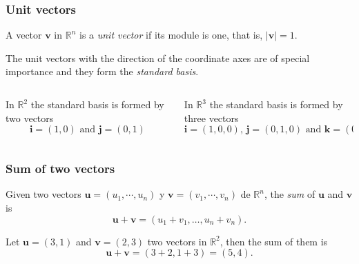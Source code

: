 \begin{frame}
\frametitle{Unit vectors}
\begin{definition}
A vector $\mathbf{v}$ in $\mathbb{R}^n$ is a \emph{unit vector} if its module is one, that is, $|\mathbf{v}|=1$.
\end{definition}

The unit vectors with the direction of the coordinate axes are of special importance and they form the \emph{standard basis}.

\begin{columns}
\begin{column}{.48\textwidth}
In $\mathbb{R}^2$ the standard basis is formed by two vectors
\[
\mathbf{i}=(1,0)\mbox{ and }\mathbf{j}=(0,1)
\]
\begin{center}

\end{center}
\end{column}
\begin{column}{.48\textwidth}
In $\mathbb{R}^3$ the standard basis is formed by three vectors
\[
\mathbf{i}=(1,0,0)\mbox{, }\mathbf{j}=(0,1,0) \mbox{ and } \mathbf{k}=(0,0,1)
\]
\begin{center}

\end{center}
\end{column}
\end{columns}
\end{frame}


\begin{frame}
\frametitle{Sum of two vectors}
\begin{definition}
Given two vectors $\mathbf{u}=(u_1,\cdots,u_n)$ y $\mathbf{v}=(v_1,\cdots,v_n)$ de $\mathbb{R}^n$, the \emph{sum} of $\mathbf{u}$ and $\mathbf{v}$ is
\[
\mathbf{u}+\mathbf{v} = (u_1+v_1,\ldots, u_n+v_n).
\]
\end{definition}

Let $\mathbf{u}=(3,1)$ and $\mathbf{v}=(2,3)$ two vectors in $\mathbb{R}^2$, then the sum of them is 
\[
\mathbf{u}+\mathbf{v} = (3+2,1+3) = (5,4).
\]

\begin{center}

\end{center}
\end{frame}


